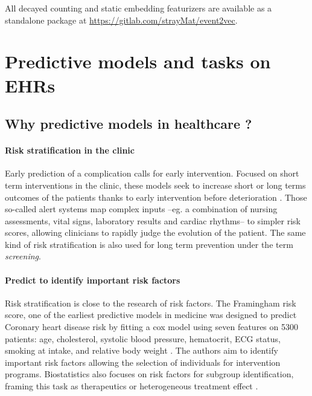 \documentclass[french,12pt,twoside,a4paper]{book}
\begin{document}
\begin{appendices}
  All decayed counting and static embedding featurizers are available as a standalone
  package at \url{https://gitlab.com/strayMat/event2vec}.


  \section{Predictive models and tasks on EHRs}\label{apd:review_predictions}

  \subsection{Why predictive models in healthcare ?}\label{apd:review_predictive_tasks}%


  \paragraph{Risk stratification in the clinic}

  Early prediction of a complication calls for early intervention. Focused on short
  term interventions in the clinic, these models seek to increase short or long
  terms outcomes of the patients thanks to early intervention before deterioration
  \citep{tang2007global, rothman2013development, wong2021external}. Those so-called alert systems
  \citep{yu2018artificial} map complex inputs --eg. a combination of nursing
  assessments, vital signs, laboratory results and cardiac rhythms-- to simpler
  risk scores, allowing clinicians to rapidly judge the evolution of the patient.
  The same kind of risk stratification is also used for long term prevention under
  the term \emph{screening}.

  \paragraph{Predict to identify important risk factors}

  Risk stratification is close to the research of risk factors.
  The Framingham risk score, one of the earliest predictive models in medicine was
  designed to predict Coronary heart disease risk by fitting a cox model using
  seven features on 5300 patients: age, cholesterol, systolic blood pressure,
  hematocrit, ECG status, smoking at intake, and relative body weight
  \citep{brand1976multivariate}. The authors aim to identify important risk factors
  allowing the selection of individuals for intervention programs.
  Biostatistics also focuses on risk factors for subgroup identification, framing
  this task as therapeutics \citep{steyerberg2009applications} or heterogeneous
  treatment effect \citep{harrell2001regression}.


\end{appendices}
\end{document}
